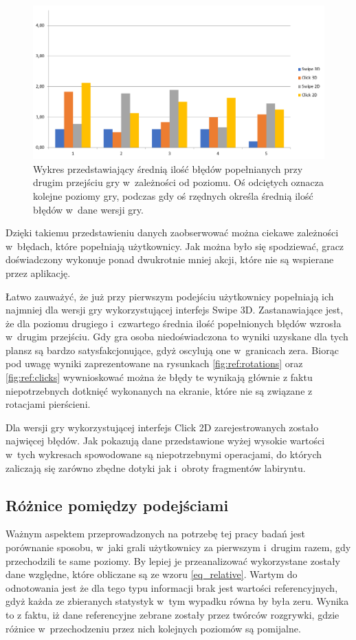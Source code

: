 \documentclass[a4paper,12pt,numbers=noenddot]{report}
\begin{document}
\begin{figure}[h!]
	\centering
  	\includegraphics[width=\linewidth]{diag/errors_2.png}
	\caption{Wykres przedstawiający średnią ilość błędów popełnianych przy drugim przejściu gry w~zależności od poziomu. Oś odciętych oznacza kolejne poziomy gry, podczas gdy oś rzędnych określa średnią ilość błędów w~dane wersji gry.}
	\label{fig:diag_errors_2}
\end{figure}

Dzięki takiemu przedstawieniu danych zaobserwować można ciekawe zależności w~błędach, które popełniają użytkownicy. Jak można było się spodziewać, gracz doświadczony wykonuje ponad dwukrotnie mniej akcji, które nie są wspierane przez aplikację. 

Łatwo zauważyć, że już przy pierwszym podejściu użytkownicy popełniają ich najmniej dla wersji gry wykorzystującej interfejs Swipe 3D. Zastanawiające jest, że dla poziomu drugiego i~czwartego średnia ilość popełnionych błędów wzrosła w~drugim przejściu. Gdy gra osoba niedoświadczona to wyniki uzyskane dla tych plansz są bardzo satysfakcjonujące, gdyż oscylują one w~granicach zera. Biorąc pod uwagę wyniki zaprezentowane na rysunkach \ref{fig:ref:rotations} oraz \ref{fig:ref:clicks} wywnioskować można że błędy te wynikają głównie z faktu niepotrzebnych dotknięć wykonanych na ekranie, które nie są związane z rotacjami pierścieni.

Dla wersji gry wykorzystującej interfejs Click 2D zarejestrowanych zostało najwięcej błędów. Jak pokazują dane przedstawione wyżej wysokie wartości w~tych wykresach spowodowane są niepotrzebnymi operacjami, do których zaliczają się zarówno zbędne dotyki jak i~obroty fragmentów labiryntu.

\subsection{Różnice pomiędzy podejściami}
Ważnym aspektem przeprowadzonych na potrzebę tej pracy badań jest porównanie sposobu, w~jaki grali użytkownicy za pierwszym i~drugim razem, gdy przechodzili te same poziomy. By lepiej je przeanalizować wykorzystane zostały dane względne, które obliczane są ze wzoru \ref{eq_relative}. Wartym do odnotowania jest że dla tego typu informacji brak jest wartości referencyjnych, gdyż każda ze zbieranych statystyk w~tym wypadku równa by była zeru. Wynika to z faktu, iż dane referencyjne zebrane zostały przez twórców rozgrywki, gdzie różnice w~przechodzeniu przez nich kolejnych poziomów są pomijalne.
\end{document}
